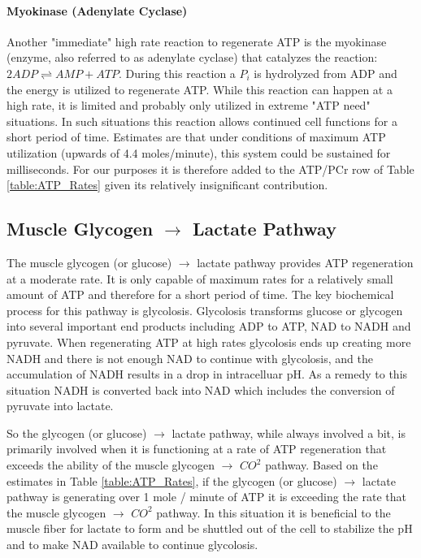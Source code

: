 \paragraph{Myokinase (Adenylate Cyclase)}

Another "immediate" high rate reaction to regenerate ATP is the myokinase (enzyme, also referred to as adenylate cyclase) that catalyzes the reaction: $2ADP \rightleftharpoons AMP + ATP$. During this reaction a $P_i$ is hydrolyzed from ADP and the energy is utilized to regenerate ATP. While this reaction can happen at a high rate, it is limited and probably only utilized in extreme "ATP need" situations. In such situations this reaction allows continued cell functions for a short period of time. Estimates are that under conditions of maximum ATP utilization (upwards of 4.4 moles/minute), this system could be sustained for milliseconds. For our purposes it is therefore added to the ATP/PCr row of Table \ref{table:ATP_Rates} given its relatively insignificant contribution.

\subsection{Muscle Glycogen $\rightarrow$ Lactate Pathway}

The muscle glycogen (or glucose) $\rightarrow$ lactate pathway provides ATP regeneration at a moderate rate. It is only capable of maximum rates for a relatively small amount of ATP and therefore for a short period of time. The key biochemical process for this pathway is glycolosis. 
Glycolosis transforms glucose or glycogen into several important end products including ADP to ATP, NAD to NADH and pyruvate. When regenerating ATP at high rates glycolosis ends up creating more NADH and there is not enough NAD to continue with glycolosis, and the accumulation of NADH results in a drop in intracelluar pH. As a remedy to this situation NADH is converted back into NAD which includes the conversion of pyruvate into lactate.

So the glycogen (or glucose) $\rightarrow$ lactate pathway, while always involved a bit, is primarily involved when it is functioning at a rate of ATP regeneration that exceeds the ability of the muscle glycogen $\rightarrow$ $CO^2$ pathway. Based on the estimates in Table \ref{table:ATP_Rates}, if the glycogen (or glucose) $\rightarrow$ lactate pathway is generating over 1 mole / minute of ATP it is exceeding the rate that the muscle glycogen $\rightarrow$ $CO^2$ pathway. In this situation it is beneficial to the muscle fiber for lactate to form and be shuttled out of the cell to stabilize the pH and to make NAD available to continue glycolosis. 

